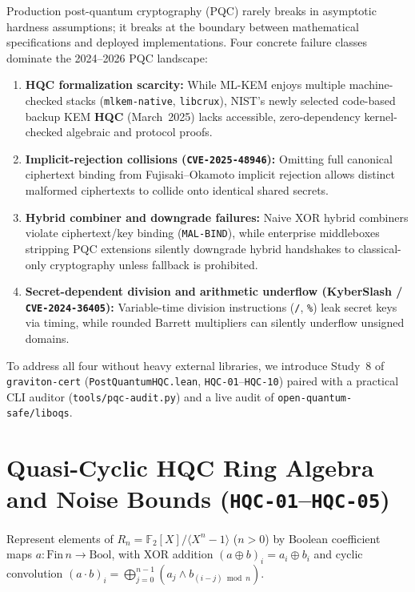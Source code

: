 \documentclass[11pt,a4paper]{article}
\theoremstyle{plain}
\theoremstyle{remark}
\newcommand{\code}[1]{\texttt{\small #1}}
\newcommand{\Ftwo}{\mathbb{F}_2}
\begin{document}
Production post-quantum cryptography (PQC) rarely breaks in asymptotic hardness assumptions; it breaks at the boundary between mathematical specifications and deployed implementations. Four concrete failure classes dominate the 2024--2026 PQC landscape:
\begin{enumerate}
  \item \textbf{HQC formalization scarcity:} While ML-KEM enjoys multiple machine-checked stacks (\code{mlkem-native}, \code{libcrux}), NIST's newly selected code-based backup KEM \textbf{HQC} (March~2025) lacks accessible, zero-dependency kernel-checked algebraic and protocol proofs.
  \item \textbf{Implicit-rejection collisions (\code{CVE-2025-48946}):} Omitting full canonical ciphertext binding from Fujisaki--Okamoto implicit rejection allows distinct malformed ciphertexts to collide onto identical shared secrets.
  \item \textbf{Hybrid combiner and downgrade failures:} Naive XOR hybrid combiners violate ciphertext/key binding (\code{MAL-BIND}), while enterprise middleboxes stripping PQC extensions silently downgrade hybrid handshakes to classical-only cryptography unless fallback is prohibited.
  \item \textbf{Secret-dependent division and arithmetic underflow (KyberSlash / \code{CVE-2024-36405}):} Variable-time division instructions (\code{/}, \code{\%}) leak secret keys via timing, while rounded Barrett multipliers can silently underflow unsigned domains.
\end{enumerate}

To address all four without heavy external libraries, we introduce Study~8 of \code{graviton-cert} (\code{PostQuantumHQC.lean}, \code{HQC-01}--\code{HQC-10}) paired with a practical CLI auditor (\code{tools/pqc-audit.py}) and a live audit of \code{open-quantum-safe/liboqs}.

\section{Quasi-Cyclic HQC Ring Algebra and Noise Bounds (\code{HQC-01}--\code{HQC-05})}
\label{sec:hqc-algebra}

Represent elements of $R_n = \Ftwo[X]/\langle X^n - 1\rangle$ ($n > 0$) by Boolean coefficient maps $a : \mathrm{Fin}\,n \to \mathrm{Bool}$, with XOR addition $(a \oplus b)_i = a_i \oplus b_i$ and cyclic convolution $(a \cdot b)_i = \bigoplus_{j=0}^{n-1} (a_j \wedge b_{(i-j)\bmod n})$.
\end{document}

